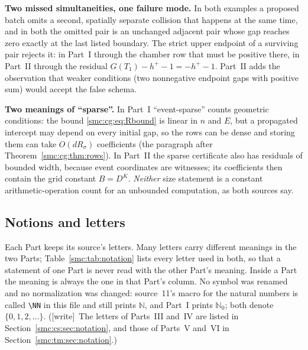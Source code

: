 \documentclass[11pt,letterpaper]{article}
\numberwithin{equation}{section}
\theoremstyle{definition}
\theoremstyle{remark}
\newcommand{\N}{\mathbb N_0}
\newcommand{\NN}{\mathbb N}
\newcommand{\wtag}{\textup{[write]}}
\begin{document}
\textbf{Two missed simultaneities, one failure mode.} In both examples a proposed batch omits a second, spatially separate collision that happens at the same time, and in both the omitted pair is an unchanged adjacent pair whose gap reaches zero exactly at the last listed boundary. The strict upper endpoint of a surviving pair rejects it: in Part~I through the chamber row that must be positive there, in Part~II through the residual $G(T_1)-h^+-1=-h^+-1$. Part~II adds the observation that weaker conditions (two nonnegative endpoint gaps with positive sum) would accept the false schema.

\textbf{Two meanings of ``sparse''.} In Part~I ``event-sparse'' counts geometric conditions: the bound \eqref{smc:cg:eq:Rbound} is linear in $n$ and $E$, but a propagated intercept may depend on every initial gap, so the rows can be dense and storing them can take $O(dR_\sigma)$ coefficients (the paragraph after Theorem~\ref{smc:cg:thm:rows}). In Part~II the sparse certificate also has residuals of bounded width, because event coordinates are witnesses; its coefficients then contain the grid constant $B=D^K$. \emph{Neither} size statement is a constant arithmetic-operation count for an unbounded computation, as both sources say.

\subsection{Notions and letters}\label{smc:sec:notation}

Each Part keeps its source's letters. Many letters carry different meanings in the two Parts; Table~\ref{smc:tab:notation} lists every letter used in both, so that a statement of one Part is never read with the other Part's meaning. Inside a Part the meaning is always the one in that Part's column. No symbol was renamed and no normalization was changed: source~11's macro for the natural numbers is called \verb|\NN| in this file and still prints $\NN$, and Part~I prints $\N$; both denote $\{0,1,2,\ldots\}$. (\wtag\ The letters of Parts~III and~IV are listed in Section~\ref{smc:cs:sec:notation}, and those of Parts~V and~VI in Section~\ref{smc:tm:sec:notation}.)
\end{document}
